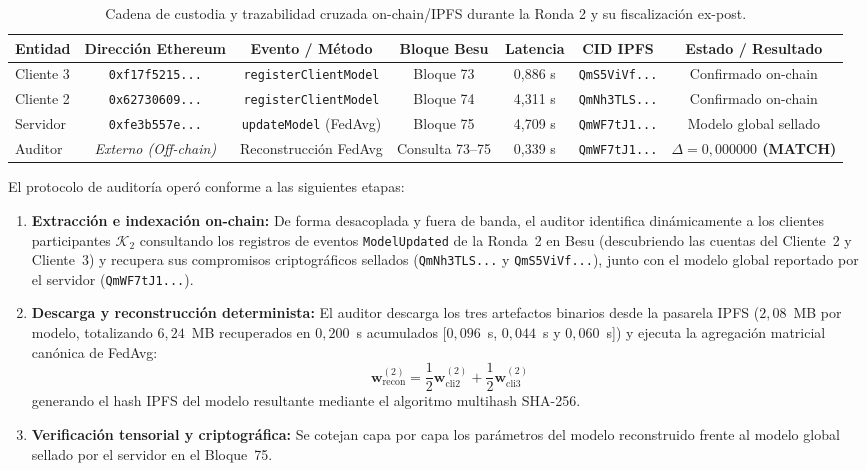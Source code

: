 \begin{table}[htbp]
\caption{Cadena de custodia y trazabilidad cruzada on-chain/IPFS durante la Ronda 2 y su fiscalización ex-post.}\label{tab:trazabilidad_ronda2}
\begin{tabular*}{\textwidth}{@{\extracolsep\fill}lcccccc}
\toprule
\textbf{Entidad} & \textbf{Dirección Ethereum} & \textbf{Evento / Método} & \textbf{Bloque Besu} & \textbf{Latencia} & \textbf{CID IPFS} & \textbf{Estado / Resultado} \\
\midrule
Cliente 3 & \texttt{0xf17f5215...} & \texttt{registerClientModel} & Bloque 73 & 0,886 s & \texttt{QmS5ViVf...} & Confirmado on-chain \\
Cliente 2 & \texttt{0x62730609...} & \texttt{registerClientModel} & Bloque 74 & 4,311 s & \texttt{QmNh3TLS...} & Confirmado on-chain \\
Servidor  & \texttt{0xfe3b557e...} & \texttt{updateModel} (FedAvg) & Bloque 75 & 4,709 s & \texttt{QmWF7tJ1...} & Modelo global sellado \\
\midrule
Auditor   & \textit{Externo (Off-chain)} & Reconstrucción FedAvg & Consulta 73--75 & 0,339 s & \texttt{QmWF7tJ1...} & \textbf{$\Delta = 0{,}000000$ (MATCH)} \\
\bottomrule
\end{tabular*}
\end{table}

El protocolo de auditoría operó conforme a las siguientes etapas:
\begin{enumerate}
    \item \textbf{Extracción e indexación on-chain:} De forma desacoplada y fuera de banda, el auditor identifica dinámicamente a los clientes participantes $\mathcal{K}_2$ consultando los registros de eventos \texttt{ModelUpdated} de la Ronda~2 en Besu (descubriendo las cuentas del Cliente~2 y Cliente~3) y recupera sus compromisos criptográficos sellados (\texttt{QmNh3TLS...} y \texttt{QmS5ViVf...}), junto con el modelo global reportado por el servidor (\texttt{QmWF7tJ1...}).
    \item \textbf{Descarga y reconstrucción determinista:} El auditor descarga los tres artefactos binarios desde la pasarela IPFS ($2{,}08$~MB por modelo, totalizando $6{,}24$~MB recuperados en $0{,}200$~s acumulados [$0{,}096$~s, $0{,}044$~s y $0{,}060$~s]) y ejecuta la agregación matricial canónica de FedAvg:
    \begin{equation}
    \mathbf{w}_{\text{recon}}^{(2)} = \frac{1}{2}\mathbf{w}_{\text{cli2}}^{(2)} + \frac{1}{2}\mathbf{w}_{\text{cli3}}^{(2)}
    \end{equation}
    generando el hash IPFS del modelo resultante mediante el algoritmo multihash SHA-256.
    \item \textbf{Verificación tensorial y criptográfica:} Se cotejan capa por capa los parámetros del modelo reconstruido frente al modelo global sellado por el servidor en el Bloque~75.
\end{enumerate}

